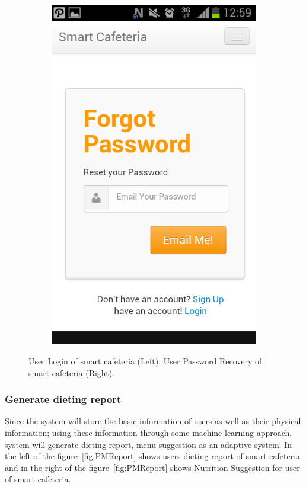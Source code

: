 \begin{figure}[h]
{\begin{subfigure}[b]{.5\textwidth}
{  \includegraphics[width=0.9\linewidth]{ch4/Prototype/Mobile/forgotpassword}
  }
\end{subfigure}
}
\caption{User Login of smart cafeteria (Left). User Password Recovery of smart cafeteria (Right).}
\label{fig:PMUserLogin}
\end{figure}

\subsubsection{Generate dieting report}
\label{Generatedietingreport}
Since the system will store the basic information of users as well as their
physical information; using these information through some machine learning
approach, system will generate dieting report, menu suggestion as an adaptive
system. In the left of the figure~\ref{fig:PMReport} shows users dieting report
of smart cafeteria and in the right of the figure~\ref{fig:PMReport} shows
Nutrition Suggestion for user of smart cafeteria.

